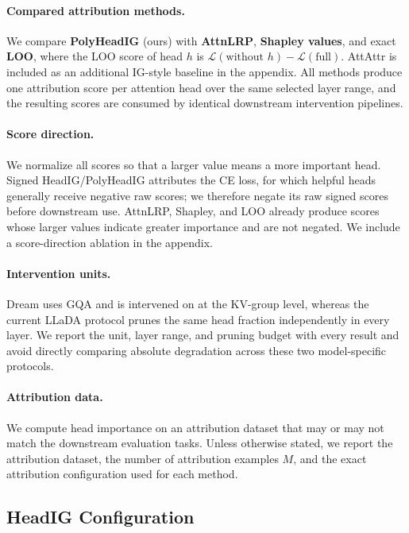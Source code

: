\paragraph{Compared attribution methods.}
We compare \textbf{PolyHeadIG} (ours) with \textbf{AttnLRP}, \textbf{Shapley values}, and exact \textbf{LOO}, where the LOO score of head $h$ is $\mathcal{L}(\text{without }h)-\mathcal{L}(\text{full})$. AttAttr is included as an additional IG-style baseline in the appendix. All methods produce one attribution score per attention head over the same selected layer range, and the resulting scores are consumed by identical downstream intervention pipelines.

\paragraph{Score direction.}
We normalize all scores so that a larger value means a more important head. Signed HeadIG/PolyHeadIG attributes the CE loss, for which helpful heads generally receive negative raw scores; we therefore negate its raw signed scores before downstream use. AttnLRP, Shapley, and LOO already produce scores whose larger values indicate greater importance and are not negated. We include a score-direction ablation in the appendix.

\paragraph{Intervention units.}
Dream uses GQA and is intervened on at the KV-group level, whereas the current LLaDA protocol prunes the same head fraction independently in every layer. We report the unit, layer range, and pruning budget with every result and avoid directly comparing absolute degradation across these two model-specific protocols.

\paragraph{Attribution data.}
We compute head importance on an attribution dataset that may or may not match the downstream evaluation tasks. Unless otherwise stated, we report the attribution dataset, the number of attribution examples $M$, and the exact attribution configuration used for each method.

\subsection{HeadIG Configuration}
\label{sec:exp:headig_config}

